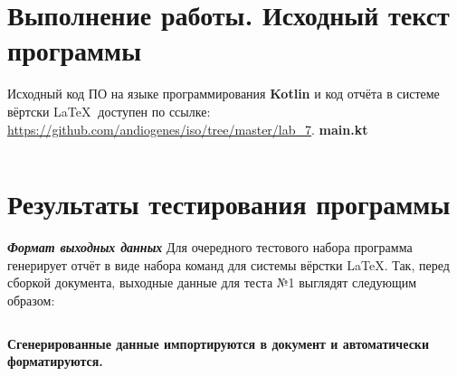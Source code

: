 \documentclass[a4paper,12pt]{article}
\begin{document}
\pagebreak

\section{\normalsize{Выполнение работы. Исходный текст программы}}
\begin{flushleft}
\justify
Исходный код ПО на языке программирования \textbf{Kotlin} и код отчёта в системе вёртски \LaTeX $~$ доступен по ссылке: \url{https://github.com/andiogenes/iso/tree/master/lab_7}.\newline\linebreak
\textbf{main.kt}
\inputminted[breaklines]{kotlin}{../src/main/kotlin/main.kt}
\end{flushleft}

\pagebreak

\section{\normalsize{Результаты тестирования программы}}
\begin{flushleft}
\justify
\textbf{\textit{Формат выходных данных}}\newline
Для очередного тестового набора программа генерирует отчёт в виде набора команд для системы вёрстки \LaTeX. Так, перед сборкой документа, выходные данные для теста №1 выглядят следующим образом:\newline
\inputminted[breaklines]{latex}{../src/main/resources/1.output}
\textbf{Сгенерированные данные импортируются в документ и автоматически форматируются.}
\end{flushleft}
\newpage
\begin{flushleft}
  
\end{flushleft}
\newpage
\begin{flushleft}
  
\end{flushleft}
\newpage
\begin{flushleft}
  
\end{flushleft}
\newpage
\begin{flushleft}
  
\end{flushleft}
\newpage
\begin{flushleft}
  
\end{flushleft}
\newpage
\begin{flushleft}
  
\end{flushleft}
\newpage
\begin{flushleft}
  
\end{flushleft}
\end{document}
